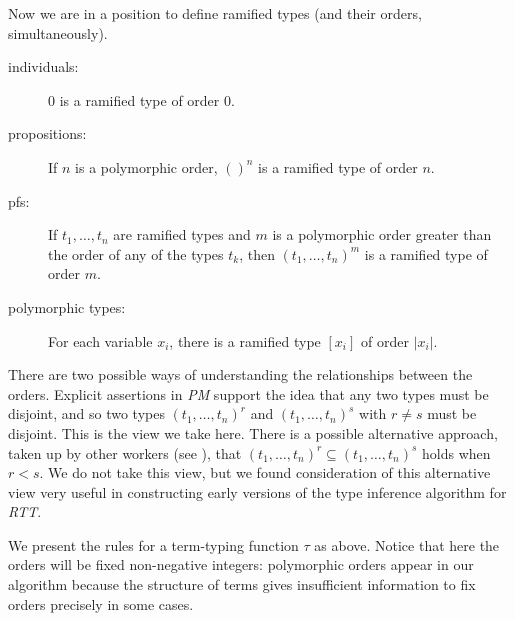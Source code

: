 \documentclass{article}
\begin{document}
Now we are in a position to define ramified types (and their orders,
simultaneously).

\begin{description}

\item[individuals:]  0 is a ramified type of order 0.

\item[propositions:] If $n$ is a polymorphic order, $()^n$ is a
ramified type of order $n$.

\item[pfs:] If $t_1,\ldots,t_n$ are ramified types
and $m$ is a polymorphic order greater than the order of any of the types
$t_k$, then $(t_1,\ldots,t_n)^m$ is a ramified type of order $m$.

\item[polymorphic types:] For each variable $x_i$, there is a ramified
type $[x_i]$ of order $|x_i|$.

\end{description}

There are two possible ways of understanding the relationships between
the orders.  Explicit assertions in {\em PM\/} support the idea that
any two types must be disjoint, and so two types $(t_1,\ldots,t_n)^r$
and $(t_1,\ldots,t_n)^s$ with $r \neq s$ must be disjoint.  This is
the view we take here.  There is a possible alternative approach,
taken up by other workers (see \cite{nestedorders}), that
$(t_1,\ldots,t_n)^r \subseteq (t_1,\ldots,t_n)^s$ holds when $r < s$.
We do not take this view, but we found consideration of this
alternative view very useful in constructing early versions of the
type inference algorithm for {\em RTT\/}.

We present the rules for a term-typing function $\tau$ as above.
Notice that here the orders will be fixed non-negative integers:
polymorphic orders appear in our algorithm because the structure of
terms gives insufficient information to fix orders precisely in some
cases.
\end{document}
